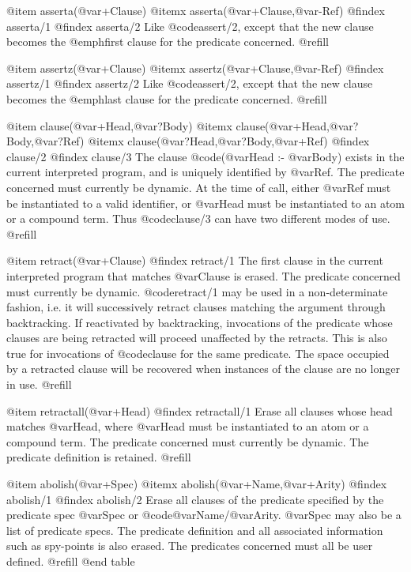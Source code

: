 @item asserta(@var{+Clause})
@itemx asserta(@var{+Clause},@var{-Ref})
@findex asserta/1
@findex asserta/2
Like @code{assert/2}, except that the new clause becomes the @emph{first}
clause for the predicate concerned. @refill

@item assertz(@var{+Clause})
@itemx assertz(@var{+Clause},@var{-Ref})
@findex assertz/1
@findex assertz/2
Like @code{assert/2}, except that the new clause becomes the @emph{last}
clause for the predicate concerned. @refill

@item clause(@var{+Head},@var{?Body})
@itemx clause(@var{+Head},@var{?Body},@var{?Ref})
@itemx clause(@var{?Head},@var{?Body},@var{+Ref})
@findex clause/2
@findex clause/3
The clause @code{(@var{Head} :- @var{Body})} exists in the current
interpreted program, and is uniquely identified by @var{Ref}.  The
predicate concerned must currently be dynamic.  At the time of call,
either @var{Ref} must be instantiated to a valid identifier, or
@var{Head} must be instantiated to an atom or a compound term.  Thus
@code{clause/3} can have two different modes of use. @refill

@item retract(@var{+Clause})
@findex retract/1
The first clause in the current interpreted program that matches
@var{Clause} is erased.  The predicate concerned must currently be
dynamic.  @code{retract/1} may be used in a non-determinate fashion,
i.e. it will successively retract clauses matching the argument through
backtracking.  If reactivated by backtracking, invocations of the
predicate whose clauses are being retracted will proceed unaffected by
the retracts.  This is also true for invocations of @code{clause} for
the same predicate.  The space occupied by a retracted clause will be
recovered when instances of the clause are no longer in use.  @refill

@item retractall(@var{+Head})
@findex retractall/1
Erase all clauses whose head matches @var{Head}, where @var{Head} must
be instantiated to an atom or a compound term.  The predicate concerned
must currently be dynamic.  The predicate definition is retained.
@refill

@item abolish(@var{+Spec})
@itemx abolish(@var{+Name},@var{+Arity})
@findex abolish/1
@findex abolish/2
Erase all clauses of the predicate specified by the predicate spec
@var{Spec} or @code{@var{Name}/@var{Arity}}.  @var{Spec} may also be a
list of predicate specs.  The predicate definition and all associated
information such as spy-points is also erased.  The predicates concerned
must all be user defined. @refill
@end table

